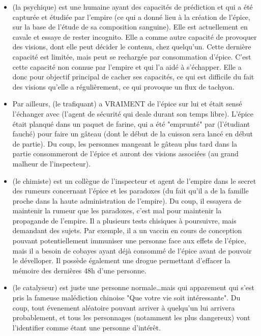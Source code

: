 {\begin{itemize}
		\item \nmPlayerIX (la psychique) est une humaine ayant des capacités de prédiction et qui a été capturée et étudiée par l'empire (ce qui a donné lieu à la création de l'épice, sur la base de l'étude de sa composition sanguine). Elle est actuellement en cavale et essaye de rester incognito. Elle a comme autre capacité de provoquer des visions, dont elle peut décider le contenu, chez quelqu'un. Cette dernière capacité est limitée, mais peut se rechargée par consommation d'épice. C'est cette capacité non connue par l'empire et qui l'a aidé à s'échapper. Elle a donc pour objectif principal de cacher ses capacités, ce qui est difficile du fait des visions qu'elle a régulièrement, ce qui provoque un flux de tachyon.
		
		\item Par ailleurs, \nmPlayerII (le trafiquant) a VRAIMENT de l'épice sur lui et était sensé l'échanger avec \nmPlayerVIII (l'agent de sécurité qui deale durant son temps libre). L'épice était planqué dans un paquet de farine, qui a été "emprunté" par \nmPlayerIII (l'étudiant fauché) pour faire un gâteau (dont le début de la cuisson sera lancé en début de partie). Du coup, les personnes mangeant le gâteau plus tard dans la partie consommeront de l'épice et auront des visions associées (au grand malheur de l'inspecteur).
		
		\item \nmPlayerXII (le chimiste) est un collègue de l'inspecteur et agent de l'empire dans le secret des rumeurs concernant l'épice et les paradoxes (du fait qu'il a de la famille proche dans la haute administration de l'empire). Du coup, il essayera de maintenir la rumeur que les paradoxes, c'est mal pour maintenir la propagande de l'empire. Il a plusieurs tests chisiques à poursuivre, mais demandant des sujets. Par exemple, il a un vaccin en cours de conception pouvant potentiellement immuniser une personne face aux effets de l'épice, mais il a besoin de cobayes ayant déjà consommé de l'épice avant de pouvoir le dévelloper. Il possède également une drogue permettant d'effacer la mémoire des dernières 48h d'une personne.
		
		\item \nmPlayerXI (le catalyseur) est juste une personne normale\dots mais qui apparement qui s'est pris la fameuse malédiction chinoise "Que votre vie soit intéressante". Du coup, tout évenement aléatoire pouvant arriver à quelqu'un lui arrivera probablement, et tous les personnages (notamment les plus dangereux) vont l'identifier comme étant une personne d'intérêt.
		

\end{itemize}}
